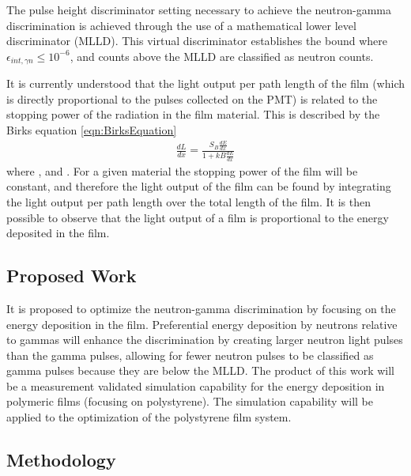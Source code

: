 The pulse height discriminator setting necessary to achieve the neutron-gamma discrimination is achieved through the use of a mathematical lower level discriminator (MLLD).
This virtual discriminator establishes the bound where $\epsilon_{int,\gamma n}\leq 10^{-6}$, and counts above the MLLD are classified as neutron counts. 

It is currently understood that the light output per path length of the film (which is directly proportional to the pulses collected on the PMT) is related to the stopping power of the radiation in the film material.
This is described by the Birks equation \eqref{eqn:BirksEquation}
\begin{align}
  \label{eqn:BirksEquation}
  \frac{dL}{dx} = \frac{S_B\frac{dE}{dx}}{1+kB\frac{dE}{dx}}
\end{align}
where , and .
For a given material the stopping power of the film will be constant, and therefore the light output of the film can be found by integrating the light output per path length over the total length of the film.
It is then possible to observe that the light output of a film is proportional to the energy deposited in the film.
\subsection{Proposed Work}
It is proposed to optimize the neutron-gamma discrimination by focusing on the energy deposition in the film.
Preferential energy deposition by neutrons relative to gammas will enhance the discrimination by creating larger neutron light pulses than the gamma pulses, allowing for fewer neutron pulses to be classified as gamma pulses because they are below the MLLD.
The product of this work will be a measurement validated simulation capability for the energy deposition in polymeric films (focusing on polystyrene).
The simulation capability will be applied to the optimization of the polystyrene film system.
\subsection{Methodology}

